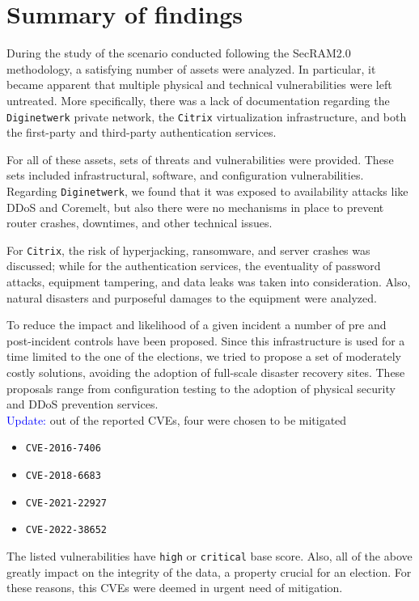 \chapter*{Summary of findings}

During the study of the scenario conducted following the SecRAM2.0 methodology\cite{article:SecRAM}, a satisfying number of assets were analyzed. In particular, it became apparent that multiple physical and technical vulnerabilities were left untreated.
More specifically, there was a lack of documentation regarding the \texttt{Diginetwerk} private network, the \texttt{Citrix} virtualization infrastructure, and both the first-party and third-party authentication services. 

For all of these assets, sets of threats and vulnerabilities were provided. These sets included infrastructural, software, and configuration vulnerabilities.
Regarding \texttt{Diginetwerk}, we found that it was exposed to availability attacks like DDoS and Coremelt, but also there were no mechanisms in place to prevent router crashes, downtimes, and other technical issues.

For \texttt{Citrix}, the risk of hyperjacking, ransomware, and server crashes was discussed; while for the authentication services, the eventuality of password attacks, equipment tampering, and data leaks was taken into consideration.
Also, natural disasters and purposeful damages to the equipment were analyzed.

To reduce the impact and likelihood of a given incident a number of pre and post-incident controls have been proposed. Since this infrastructure is used for a time limited to the one of the elections, we tried to propose a set of moderately costly solutions, avoiding the adoption of full-scale disaster recovery sites. These proposals range from configuration testing to the adoption of physical security and DDoS prevention services.\\

\noindent \textcolor{blue}{Update:} out of the reported CVEs, four were chosen to be mitigated

\begin{itemize}
    \item \texttt{CVE-2016-7406}
    \item \texttt{CVE-2018-6683}
    \item \texttt{CVE-2021-22927}
    \item \texttt{CVE-2022-38652}
\end{itemize}

The listed vulnerabilities have \texttt{high} or \texttt{critical} base score. Also, all of the above greatly impact on the integrity of the data, a property crucial for an election. For these reasons, this CVEs were deemed in urgent need of mitigation.

